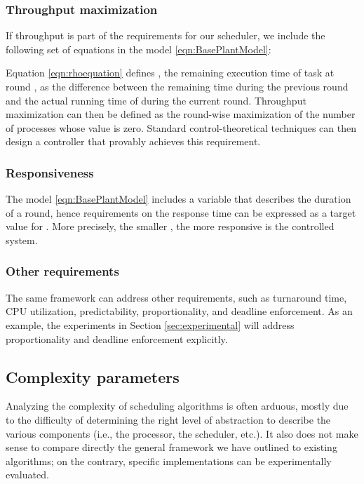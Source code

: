 \documentclass[a4paper]{article}
\begin{document}
\subsubsection{Throughput maximization}
If throughput is part of the requirements for our scheduler, we include the 
following set of equations in the model \eqref{eqn:BasePlantModel}:

Equation \eqref{eqn:rhoequation} defines , the remaining execution 
time of task  at round , as the difference between the remaining time 
during the previous round and the actual running time of  during the current 
round.
Throughput maximization can then be defined as the round-wise maximization of 
the number of processes whose  value is zero.
Standard control-theoretical techniques can then design a controller that 
provably achieves this requirement.

\subsubsection{Responsiveness} 
The model \eqref{eqn:BasePlantModel} includes a variable  that describes
the duration of a round, hence requirements on the response time can be 
expressed as a target value for . More precisely, the smaller ,
the more responsive is the controlled system.

\subsubsection{Other requirements}
The same framework can address other requirements, such as turnaround time, 
CPU utilization, predictability, proportionality, and deadline enforcement.
As an example, the experiments in Section \ref{sec:experimental} will address
proportionality and deadline enforcement explicitly.


\subsection{Complexity parameters}
\label{sec:complexity}
Analyzing the complexity of scheduling algorithms is often arduous, mostly 
due to the difficulty of determining the right level of abstraction to describe
the various components (i.e., the processor, the scheduler, etc.).
It also does not make sense to compare directly the general framework we
have outlined to existing algorithms; on the contrary, specific implementations
can be experimentally evaluated.
\end{document}
